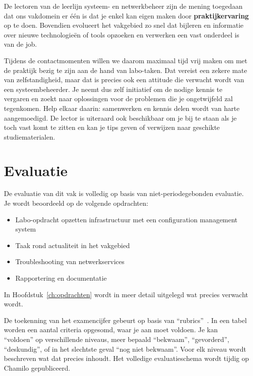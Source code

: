 De lectoren van de leerlijn systeem- en netwerkbeheer zijn de
mening toegedaan dat ons vakdomein er één is dat je enkel kan eigen
maken door \textbf{praktijkervaring} op te doen. Bovendien evolueert het
vakgebied zo snel dat bijleren en informatie over nieuwe
technologieën of tools opzoeken en verwerken een vast onderdeel is van de job.

Tijdens de contactmomenten willen we daarom maximaal tijd vrij maken om
met de praktijk bezig te zijn aan de hand van labo-taken. Dat vereist
een zekere mate van zelfstandigheid, maar dat is precies ook een
attitude die verwacht wordt van een systeembeheerder. Je neemt dus zelf
initiatief om de nodige kennis te vergaren en zoekt naar oplossingen
voor de problemen die je ongetwijfeld zal tegenkomen. Help elkaar
daarin: samenwerken en kennis delen wordt van harte aangemoedigd. De
lector is uiteraard ook beschikbaar om je bij te staan als je toch vast
komt te zitten en kan je tips geven of verwijzen naar geschikte
studiematerialen.

\section{Evaluatie}
\label{evaluatie}

De evaluatie van dit vak is volledig op basis van niet-periodegebonden
evaluatie. Je wordt beoordeeld op de volgende opdrachten:

\begin{itemize}
\item
  Labo-opdracht opzetten infrastructuur met een configuration management
  system
\item
  Taak rond actualiteit in het vakgebied
\item
  Troubleshooting van netwerkservices
\item
  Rapportering en documentatie
\end{itemize}

In Hoofdstuk~\ref{ch:opdrachten} wordt in meer detail uitgelegd wat precies verwacht wordt.

De toekenning van het examencijfer gebeurt op basis van ``rubrics''~\autocite{Andrade2000}. In een tabel worden een aantal criteria opgesomd, waar je aan moet voldoen. Je kan ``voldoen'' op verschillende niveaus, meer bepaald ``bekwaam'', ``gevorderd'', ``deskundig'', of in het slechtste geval ``nog niet bekwaam''. Voor elk niveau wordt beschreven wat dat precies inhoudt. Het volledige evaluatieschema wordt tijdig op Chamilo gepubliceerd.

